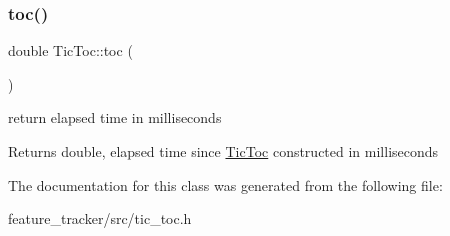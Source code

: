 \subsubsection{\texorpdfstring{toc()}{toc()}}
{\footnotesize\ttfamily double Tic\+Toc\+::toc (\begin{DoxyParamCaption}{ }\end{DoxyParamCaption})\hspace{0.3cm}{\ttfamily [inline]}}



return elapsed time in milliseconds 

\begin{DoxyReturn}{Returns}
double, elapsed time since \hyperlink{classTicToc}{Tic\+Toc} constructed in milliseconds 
\end{DoxyReturn}


The documentation for this class was generated from the following file\+:\begin{DoxyCompactItemize}
\item 
feature\+\_\+tracker/src/tic\+\_\+toc.\+h\end{DoxyCompactItemize}
